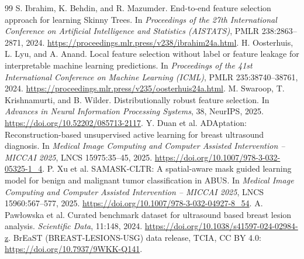 \documentclass[11pt,a4paper]{article}
\begin{document}
\begin{thebibliography}{99}
 S. Ibrahim, K. Behdin, and R. Mazumder. End-to-end feature selection approach for learning Skinny Trees. In \emph{Proceedings of the 27th International Conference on Artificial Intelligence and Statistics (AISTATS)}, PMLR 238:2863--2871, 2024. \url{https://proceedings.mlr.press/v238/ibrahim24a.html}.
 H. Oosterhuis, L. Lyu, and A. Anand. Local feature selection without label or feature leakage for interpretable machine learning predictions. In \emph{Proceedings of the 41st International Conference on Machine Learning (ICML)}, PMLR 235:38740--38761, 2024. \url{https://proceedings.mlr.press/v235/oosterhuis24a.html}.
 M. Swaroop, T. Krishnamurti, and B. Wilder. Distributionally robust feature selection. In \emph{Advances in Neural Information Processing Systems}, 38, NeurIPS, 2025. \url{https://doi.org/10.52202/085713-2117}.
 Y. Duan et al. ADAptation: Reconstruction-based unsupervised active learning for breast ultrasound diagnosis. In \emph{Medical Image Computing and Computer Assisted Intervention -- MICCAI 2025}, LNCS 15975:35--45, 2025. \url{https://doi.org/10.1007/978-3-032-05325-1_4}.
 P. Xu et al. SAMASK-CLTR: A spatial-aware mask guided learning model for benign and malignant tumor classification in ABUS. In \emph{Medical Image Computing and Computer Assisted Intervention -- MICCAI 2025}, LNCS 15960:567--577, 2025. \url{https://doi.org/10.1007/978-3-032-04927-8_54}.
 A. Paw\l{}owska et al. Curated benchmark dataset for ultrasound based breast lesion analysis. \emph{Scientific Data}, 11:148, 2024. \url{https://doi.org/10.1038/s41597-024-02984-z}. BrEaST (BREAST-LESIONS-USG) data release, TCIA, CC BY 4.0: \url{https://doi.org/10.7937/9WKK-Q141}.
\end{thebibliography}
\end{document}

